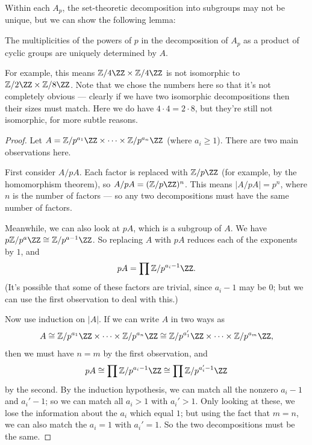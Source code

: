 Within each $A_p$, the set-theoretic decomposition into subgroups may not be unique, but we can show the following lemma:

\begin{lemma}
    The multiplicities of the powers of $p$ in the decomposition of $A_p$ as a product of cyclic groups are uniquely determined by $A$. 
\end{lemma}

For example, this means $\mathbb{Z}/4\ZZ \times \mathbb{Z}/4\ZZ$ is not isomorphic to $\mathbb{Z}/2\ZZ \times \mathbb{Z}/8\ZZ$. Note that we chose the numbers here so that it's not completely obvious --- clearly if we have two isomorphic decompositions then their sizes must match. Here we do have $4 \cdot 4 = 2 \cdot 8$, but they're still not isomorphic, for more subtle reasons.

\begin{proof}
    Let $A = \mathbb{Z}/p^{a_1}\ZZ \times \cdots \times \mathbb{Z}/p^{a_n}\ZZ$ (where $a_i \geq 1$). There are two main observations here. 

    First consider $A/pA$. Each factor is replaced with $\mathbb{Z}/p\ZZ$ (for example, by the homomorphism theorem), so $A/pA = (\mathbb{Z}/p\ZZ)^n$. This means $|A/pA| = p^n$, where $n$ is the number of factors --- so any two decompositions must have the same number of factors. 

    Meanwhile, we can also look at $pA$, which is a subgroup of $A$. We have $p\mathbb{Z}/p^a\ZZ \cong \mathbb{Z}/p^{a - 1}\ZZ$. So replacing $A$ with $pA$ reduces each of the exponents by $1$, and \[pA = \prod \mathbb{Z}/p^{a_i - 1}\ZZ.\] (It's possible that some of these factors are trivial, since $a_i - 1$ may be $0$; but we can use the first observation to deal with this.)

    Now use induction on $|A|$. If we can write $A$ in two ways as \[A \cong \mathbb{Z}/p^{a_1}\ZZ \times \cdots \times \mathbb{Z}/p^{a_n}\ZZ \cong \mathbb{Z}/p^{a_1'}\ZZ \times \cdots \times \mathbb{Z}/p^{a_m}\ZZ,\] then we must have $n = m$ by the first observation, and \[pA \cong \prod \mathbb{Z}/p^{a_i - 1}\ZZ \cong \prod \mathbb{Z}/p^{a_i' - 1}\ZZ\] by the second. By the induction hypothesis, we can match all the nonzero $a_i - 1$ and $a_i' - 1$; so we can match all $a_i > 1$ with $a_i' > 1$. Only looking at these, we lose the information about the $a_i$ which equal $1$; but using the fact that $m = n$, we can also match the $a_i = 1$ with $a_i' = 1$. So the two decompositions must be the same. 
\end{proof}

